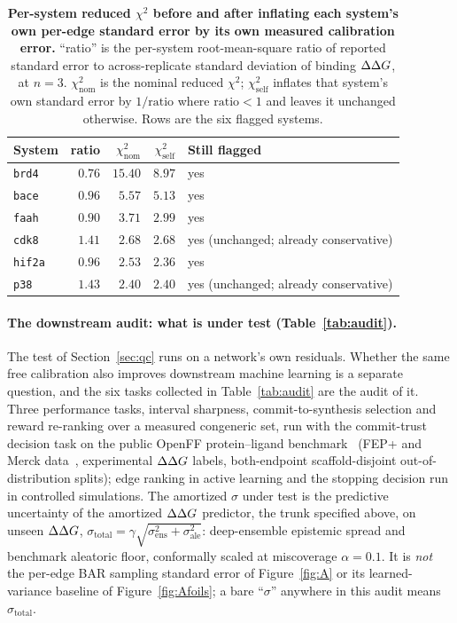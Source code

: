 \begin{table}[t]\centering
\caption{\textbf{Per-system reduced $\chi^2$ before and after inflating each system's own
per-edge standard error by its own measured calibration error.} ``ratio'' is the per-system
root-mean-square ratio of reported standard error to across-replicate standard deviation of
binding $\Delta\Delta G$, at $n=3$. $\chi^2_{\text{nom}}$ is the nominal reduced $\chi^2$;
$\chi^2_{\text{self}}$ inflates that system's own standard error by $1/\mathrm{ratio}$ where
$\mathrm{ratio}<1$ and leaves it unchanged otherwise. Rows are the six flagged systems.}
\label{tab:P8}
\small
\begin{tabular}{@{}lrrrl@{}}
\toprule
System & ratio & $\chi^2_{\text{nom}}$ & $\chi^2_{\text{self}}$ & Still flagged \\
\midrule
\texttt{brd4}  & $0.76$ & $15.40$ & $8.97$ & yes \\
\texttt{bace}  & $0.96$ & $5.57$  & $5.13$ & yes \\
\texttt{faah}  & $0.90$ & $3.71$  & $2.99$ & yes \\
\texttt{cdk8}  & $1.41$ & $2.68$  & $2.68$ & yes (unchanged; already conservative) \\
\texttt{hif2a} & $0.96$ & $2.53$  & $2.36$ & yes \\
\texttt{p38}   & $1.43$ & $2.40$  & $2.40$ & yes (unchanged; already conservative) \\
\bottomrule
\end{tabular}
\end{table}

\paragraph{The downstream audit: what is under test (Table~\ref{tab:audit}).} The test of
Section~\ref{sec:qc} runs on a network's own residuals. Whether the same free calibration also
improves downstream machine learning is a separate question, and the six tasks collected in
Table~\ref{tab:audit} are the audit of it. Three performance tasks, interval sharpness,
commit-to-synthesis selection and reward re-ranking over a measured congeneric set, run with the
commit-trust decision task on the public OpenFF protein--ligand
benchmark~\citep{hahn2022plbench} (FEP+ and Merck data~\citep{wang2015fep,schindler2020merck},
experimental $\Delta\Delta G$ labels, both-endpoint scaffold-disjoint out-of-distribution splits); edge
ranking in active learning and the stopping decision run in controlled simulations. The amortized
$\sigma$ under test is the predictive uncertainty of the amortized $\Delta\Delta G$ predictor, the trunk
specified above, on unseen $\Delta\Delta G$,
$\sigma_{\text{total}}=\gamma\sqrt{\sigma^2_{\text{ens}}+\sigma^2_{\text{ale}}}$: deep-ensemble
epistemic spread and benchmark aleatoric floor, conformally scaled at miscoverage $\alpha=0.1$. It
is \emph{not} the per-edge BAR sampling standard error of Figure~\ref{fig:A} or its
learned-variance baseline of Figure~\ref{fig:Afoils}; a bare ``$\sigma$'' anywhere in this audit
means $\sigma_{\text{total}}$.


